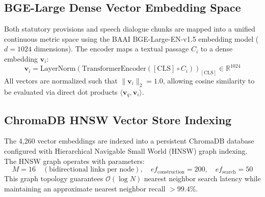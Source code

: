 \documentclass{llncs}
\begin{document}
\subsection{BGE-Large Dense Vector Embedding Space}
Both statutory provisions and speech dialogue chunks are mapped into a unified continuous metric space using the BAAI BGE-Large-EN-v1.5 embedding model ($d = 1024$ dimensions). The encoder maps a textual passage $C_i$ to a dense embedding $\mathbf{v}_i$:
\begin{equation}
\mathbf{v}_i = \text{LayerNorm}\left(\text{TransformerEncoder}([\text{CLS}] \circ C_i)\right)_{[\text{CLS}]} \in \mathbb{R}^{1024}
\end{equation}
All vectors are normalized such that $\|\mathbf{v}_i\|_2 = 1.0$, allowing cosine similarity to be evaluated via direct dot products $\langle \mathbf{v}_q, \mathbf{v}_i \rangle$.

\subsection{ChromaDB HNSW Vector Store Indexing}
The 4,260 vector embeddings are indexed into a persistent ChromaDB database configured with Hierarchical Navigable Small World (HNSW) graph indexing. The HNSW graph operates with parameters:
\begin{equation}
M = 16 \quad (\text{bidirectional links per node}), \quad ef_{\text{construction}} = 200, \quad ef_{\text{search}} = 50
\end{equation}
This graph topology guarantees $\mathcal{O}(\log N)$ nearest neighbor search latency while maintaining an approximate nearest neighbor recall $>99.4\%$.
\end{document}
